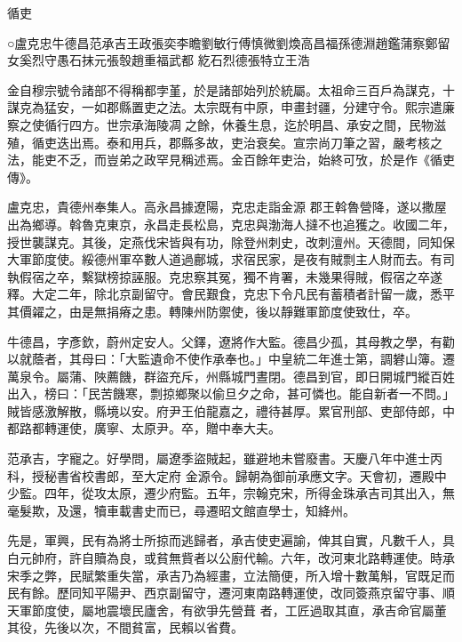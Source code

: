 
\begin{pinyinscope}

 循吏



 ○盧克忠牛德昌范承吉王政張奕李瞻劉敏行傅慎微劉煥高昌福孫德淵趙鑑蒲察鄭留女奚烈守愚石抹元張彀趙重福武都
 紇石烈德張特立王浩



 金自穆宗號令諸部不得稱都孛堇，於是諸部始列於統屬。太祖命三百戶為謀克，十謀克為猛安，一如郡縣置吏之法。太宗既有中原，申畫封疆，分建守令。熙宗遣廉察之使循行四方。世宗承海陵凋之餘，休養生息，迄於明昌、承安之間，民物滋殖，循吏迭出焉。泰和用兵，郡縣多故，吏治衰矣。宣宗尚刀筆之習，嚴考核之法，能吏不乏，而豈弟之政罕見稱述焉。金百餘年吏治，始終可攷，於是作《循吏傳》。



 盧克忠，貴德州奉集人。高永昌據遼陽，克忠走詣金源
 郡王斡魯營降，遂以撒屋出為鄉導。斡魯克東京，永昌走長松島，克忠與渤海人撻不也追獲之。收國二年，授世襲謀克。其後，定燕伐宋皆與有功，除登州刺史，改刺澶州。天德間，同知保大軍節度使。綏德州軍卒數人道過鄜城，求宿民家，是夜有賊剽主人財而去。有司執假宿之卒，繫獄榜掠誣服。克忠察其冤，獨不肯署，未幾果得賊，假宿之卒遂釋。大定二年，除北京副留守。會民艱食，克忠下令凡民有蓄積者計留一歲，悉平其價糴之，由是無捐瘠之患。轉陳州防禦使，後以靜難軍節度使致仕，卒。



 牛德昌，字彥欽，蔚州定安人。父鐸，遼將作大監。德昌少孤，其母教之學，有勸以就蔭者，其母曰：「大監遺命不使作承奉也。」中皇統二年進士第，調礬山簿。遷萬泉令。屬蒲、陜薦饑，群盜充斥，州縣城門晝閉。德昌到官，即日開城門縱百姓出入，榜曰：「民苦饑寒，剽掠鄉聚以偷旦夕之命，甚可憐也。能自新者一不問。」賊皆感激解散，縣境以安。府尹王伯龍嘉之，禮待甚厚。累官刑部、吏部侍郎，中都路都轉運使，廣寧、太原尹。卒，贈中奉大夫。



 范承吉，字寵之。好學問，屬遼季盜賊起，雖避地未嘗廢書。天慶八年中進士丙科，授秘書省校書郎，至大定府
 金源令。歸朝為御前承應文字。天會初，遷殿中少監。四年，從攻太原，遷少府監。五年，宗翰克宋，所得金珠承吉司其出入，無毫髮欺，及還，犢車載書史而已，尋遷昭文館直學士，知絳州。



 先是，軍興，民有為將士所掠而逃歸者，承吉使吏遍諭，俾其自實，凡數千人，具白元帥府，許自贖為良，或貧無貲者以公廚代輸。六年，改河東北路轉運使。時承宋季之弊，民賦繁重失當，承吉乃為經畫，立法簡便，所入增十數萬斛，官既足而民有餘。歷同知平陽尹、西京副留守，遷河東南路轉運使，改同簽燕京留守事、順天軍節度使，屬地震壞民廬舍，有欲爭先營葺
 者，工匠過取其直，承吉命官屬董其役，先後以次，不間貧富，民賴以省費。




\end{pinyinscope}

